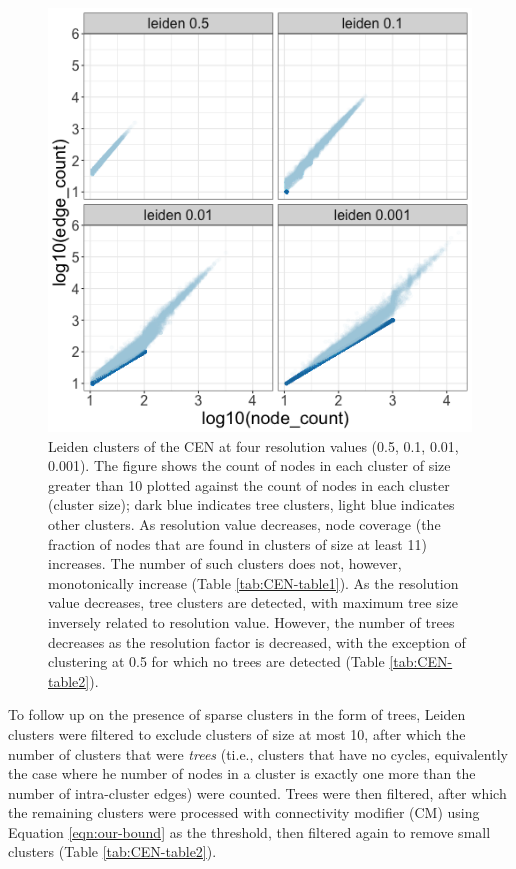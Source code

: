 \documentclass[11pt]{article}   	%
\begin{document}
\begin{figure}[h]
\centering
\includegraphics[width=0.4\linewidth]{figs/cen_quad_fig1.png}
\caption{Leiden clusters of the CEN at four resolution values (0.5, 0.1, 0.01, 0.001).
The figure shows the count of nodes in each cluster of size greater than 10 plotted against the count of nodes in each cluster (cluster size); dark blue indicates tree clusters, light blue indicates other clusters.
As resolution value decreases, node coverage (the fraction of nodes that are found in clusters of size at least 11) increases. The number of such clusters does not, however, monotonically increase (Table \ref{tab:CEN-table1}). As the resolution value decreases, tree clusters are detected, with maximum tree size inversely related to resolution value. However, the number of trees decreases as the resolution factor is decreased, with the exception of clustering at 0.5 for which no trees are detected (Table \ref{tab:CEN-table2}).}
\end{figure}

To follow up on the presence of sparse clusters in the form of trees, Leiden clusters were filtered to exclude clusters of size at most 10, after which the number of clusters that were \emph{trees} (ti.e., clusters that have no cycles, equivalently the case where he number of nodes in a cluster is exactly  one more than the number of intra-cluster edges) were counted. Trees were then filtered, after which the remaining clusters were processed with connectivity modifier (CM) using Equation \ref{eqn:our-bound} as the threshold, then filtered again to remove small clusters (Table \ref{tab:CEN-table2}).

\end{document}
